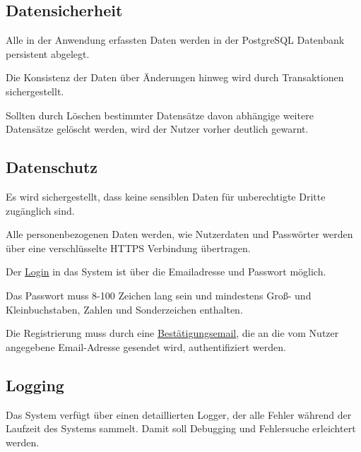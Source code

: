 \subsection{Datensicherheit}

\begin{description}
	 Alle in der Anwendung erfassten Daten werden in der PostgreSQL Datenbank persistent abgelegt.

	 Die Konsistenz der Daten über Änderungen hinweg wird durch Transaktionen sichergestellt.

	 Sollten durch Löschen bestimmter Datensätze davon abhängige weitere Datensätze gelöscht werden, wird der Nutzer vorher deutlich gewarnt.
\end{description}

\subsection{Datenschutz}

\begin{description}
	 Es wird sichergestellt, dass keine sensiblen Daten für unberechtigte Dritte zugänglich sind.

	 Alle personenbezogenen Daten werden, wie Nutzerdaten und Passwörter werden über eine verschlüsselte HTTPS Verbindung übertragen.

	 Der \hyperref[funkt:080]{Login} in das System ist über die Emailadresse und Passwort möglich.

	 Das Passwort muss 8-100 Zeichen lang sein und mindestens Groß- und Kleinbuchstaben, Zahlen und Sonderzeichen enthalten.

	 Die Registrierung muss durch eine \hyperref[funkt:060]{Bestätigungsemail}, die an die vom Nutzer angegebene Email-Adresse gesendet wird, authentifiziert werden.
\end{description}

\subsection{Logging}

\begin{description}
	 Das System verfügt über einen detaillierten Logger, der alle Fehler während der Laufzeit des Systems sammelt. Damit soll Debugging und Fehlersuche erleichtert werden.
\end{description}

